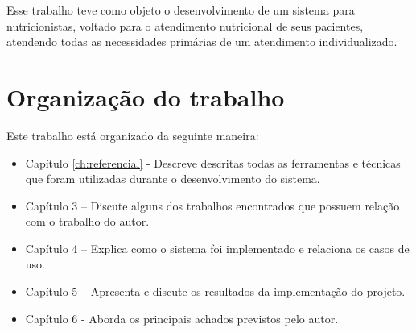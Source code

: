 Esse trabalho teve como objeto o desenvolvimento de um sistema para
nutricionistas, voltado para o atendimento nutricional de seus pacientes, atendendo
todas as necessidades primárias de um atendimento individualizado.

\section{Organização do trabalho}
Este trabalho está organizado da seguinte maneira:

{\color{red}

 \begin{itemize}

	\item Capítulo \ref{ch:referencial}  - Descreve descritas todas as ferramentas e técnicas que foram utilizadas durante o desenvolvimento do sistema.
	\item Capítulo 3 – Discute alguns dos trabalhos encontrados que possuem relação com o trabalho do autor.
	\item Capítulo 4 – Explica como o sistema foi implementado e relaciona os casos de uso.
	\item Capítulo 5 – Apresenta e discute os resultados da implementação do projeto.
	\item Capítulo 6 - Aborda os principais achados previstos pelo autor.

\end{itemize}
}